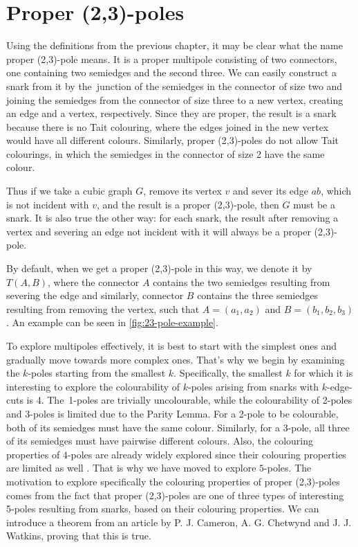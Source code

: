 \section{Proper (2,3)-poles}\label{ch:proper-23-poles}

Using the definitions from the previous chapter, it may be clear what the name proper (2,3)-pole means. It is a proper multipole consisting of two connectors, one containing two semiedges and the second three. We can easily construct a snark from it by the~junction of the semiedges in the connector of size two and joining the semiedges from the connector of size three to a new vertex, creating an edge and a vertex, respectively. Since they are proper, the result is a snark because there is no Tait colouring, where the edges joined in the new vertex would have all different colours. Similarly, proper (2,3)-poles do not allow Tait colourings, in which the semiedges in the connector of size 2 have the same colour.

Thus if we take a cubic graph $G$, remove its vertex $v$ and sever its edge $ab$, which is not incident with $v$, and the result is a proper (2,3)-pole, then $G$ must be a snark. It is also true the other way: for each snark, the result after removing a vertex and severing an edge not incident with it will always be a proper (2,3)-pole.

By default, when we get a proper (2,3)-pole in this way, we denote it by $T(A,B)$, where the connector $A$ contains the two semiedges resulting from severing the edge and similarly, connector $B$ contains the three semiedges resulting from removing the vertex, such that $A=(a_1,a_2)$ and $B=(b_1,b_2,b_3)$. An example can be seen in \cref{fig:23-pole-example}.

\begin{figure*}
	\centering
	
	\caption{Creation of a proper $(2,3)$-pole from a snark $G$}
	\label{fig:23-pole-example}
\end{figure*}

To explore multipoles effectively, it is best to start with the simplest ones and gradually move towards more complex ones. That's why we begin by examining the $k$-poles starting from the smallest $k$. Specifically, the smallest $k$ for which it is interesting to explore the colourability of $k$-poles arising from snarks with $k$-edge-cuts is 4. The~1-poles are trivially uncolourable, while the colourability of 2-poles and 3-poles is limited due to the Parity Lemma. For a 2-pole to be colourable, both of its semiedges must have the same colour. Similarly, for a 3-pole, all three of its semiedges must have pairwise different colours. Also, the colouring properties of $4$-poles are already widely explored since their colouring properties are limited as well \cite{ChladnyFactorisation}. That is why we have moved to explore $5$-poles. The motivation to explore specifically the colouring properties of proper (2,3)-poles comes from the fact that proper (2,3)-poles are one of three types of interesting 5-poles resulting from snarks, based on their colouring properties. We can introduce a theorem from an article by P. J. Cameron, A. G. Chetwynd and J. J. Watkins, proving that this is true.

